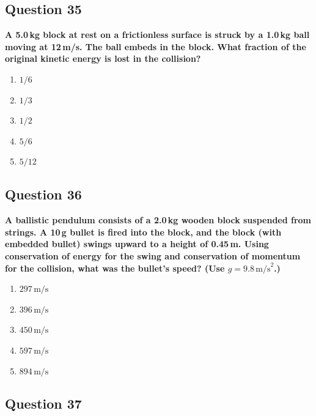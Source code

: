 \documentclass[12pt,letterpaper]{article}
\begin{document}
\subsection{Question 35}

\begin{questionbox}
\textbf{A 5.0\,kg block at rest on a frictionless surface is struck by a 1.0\,kg ball moving at 12\,m/s. The ball embeds in the block. What fraction of the original kinetic energy is lost in the collision?}

\begin{enumerate}[label=\alph*)]
    \item $1/6$
    \item $1/3$
    \item $1/2$
    \item $5/6$
    \item $5/12$
\end{enumerate}
\end{questionbox}

\subsection{Question 36}

\begin{questionbox}
\textbf{A ballistic pendulum consists of a 2.0\,kg wooden block suspended from strings. A 10\,g bullet is fired into the block, and the block (with embedded bullet) swings upward to a height of 0.45\,m. Using conservation of energy for the swing and conservation of momentum for the collision, what was the bullet's speed? (Use $g = 9.8\,\text{m/s}^2$.)}

\begin{enumerate}[label=\alph*)]
    \item $297\,\text{m/s}$
    \item $396\,\text{m/s}$
    \item $450\,\text{m/s}$
    \item $597\,\text{m/s}$
    \item $894\,\text{m/s}$
\end{enumerate}
\end{questionbox}

\subsection{Question 37}
\end{document}
